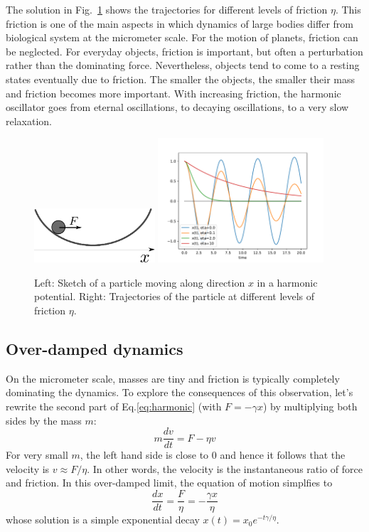 The solution in Fig.~\ref{fig:harmonic} shows the trajectories for different levels of friction $\eta$.
This friction is one of the main aspects in which dynamics of large bodies differ from biological system at the micrometer scale.
For the motion of planets, friction can be neglected.
For everyday objects, friction is important, but often a perturbation rather than the dominating force. Nevertheless, objects tend to come to a resting states eventually due to friction.
The smaller the objects, the smaller their mass and friction becomes more important.
With increasing friction, the harmonic oscillator goes from eternal oscillations, to decaying oscillations, to a very slow relaxation.

\begin{figure}
    \includegraphics[width=0.4\textwidth]{figures/harmonic.pdf}
    \includegraphics[width=0.55\textwidth]{figures/harmonic_traj.pdf}
    \caption{\label{fig:harmonic}Left: Sketch of a particle moving along direction $x$ in a harmonic potential. Right: Trajectories of the particle at different levels of friction $\eta$.}
\end{figure}


\subsection{Over-damped dynamics}
On the micrometer scale, masses are tiny and friction is typically completely dominating the dynamics.
To explore the consequences of this observation, let's rewrite the second part of Eq.\ref{eq:harmonic} (with $F=-\gamma x$) by multiplying both sides by the mass $m$:
\begin{equation}
    m\frac{dv}{dt} = F - \eta v
\end{equation}
For very small $m$, the left hand side is close to $0$ and hence it follows that the velocity is $v \approx F/\eta$.
In other words, the velocity is the instantaneous ratio of force and friction.
In this over-damped limit, the equation of motion simplfies to
\begin{equation}
    \frac{dx}{dt} = \frac{F}{\eta} = -\frac{\gamma x}{\eta}
\end{equation}
whose solution is a simple exponential decay $x(t) = x_0 e^{-t \gamma/\eta}$.

